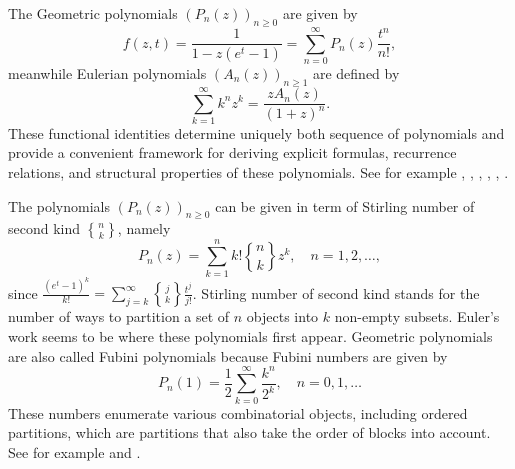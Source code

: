 \documentclass[11pt]{article}
\DeclareRobustCommand{\stirling}{\genfrac\{\}{0pt}{}}
\begin{document}
The Geometric polynomials $(P_n(z))_{n\ge 0}$ are given by
\begin{equation}
\label{mainEquation}
f(z,t)=\frac{1}{1-z(e^t-1)}=\sum_{n=0}^\infty P_n(z)\frac{t^n}{n!},
\end{equation}
meanwhile Eulerian polynomials $(A_n(z))_{n\ge 1}$  are  defined by
\[
\sum_{k=1}^\infty k^nz^k=\frac{zA_n(z)}{(1+z)^n}.
\]
These functional identities determine uniquely  both sequence 
of polynomials and provide a convenient framework for deriving explicit formulas, recurrence relations, and structural properties of these polynomials. See for example \cite{Ade_Ben_Nko}, \cite{Boy_Dil}, \cite{Dur}, \cite{Gra_Knu_Pat}, \cite{Mez}, \cite{Tan}. 

 The polynomials $(P_n(z))_{n\ge 0}$  can be given in term of Stirling number of second kind $\stirling{n}{k}$, namely
\begin{equation}
\label{eqPolStirling}
P_n(z)=\sum_{k=1}^{n}k!\stirling{n}{k}z^k,\quad n=1,2,\ldots,
\end{equation}
since $\frac{(e^t-1)^k}{k!}=\sum_{j=k}^\infty \stirling{j}{k}\frac{t^j}{j!}$. Stirling number of second kind  stands for the number of ways to partition a set of $n$ objects into $k$ non-empty subsets. Euler's work \cite[p. 485]{Eul} seems to be where these polynomials first appear.  Geometric polynomials are also called Fubini polynomials because Fubini numbers are given by
\begin{equation}
\label{FubNum}
P_n(1)=\frac12\sum_{k=0}^\infty\frac{k^n}{2^k},\quad n=0,1,\ldots
\end{equation}
These numbers enumerate various combinatorial objects, including ordered partitions, which are partitions that also take the order of blocks into account. See  for example \cite{Fla_Sed}  and \cite{Gro}.
\end{document}
